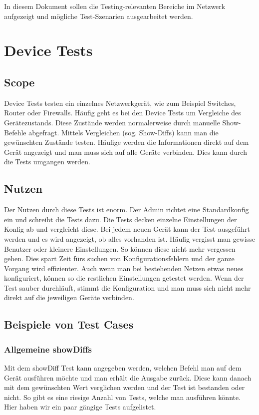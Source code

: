 \documentclass[a4,12pt]{scrartcl}
\begin{document}
\noindent In diesem Dokument sollen die Testing-relevanten Bereiche im Netzwerk aufgezeigt und mögliche Test-Szenarien ausgearbeitet werden.
\newpage
\section{Device Tests}
\subsection{Scope}
Device Tests testen ein einzelnes Netzwerkgerät, wie zum Beispiel Switches, Router oder Firewalls. Häufig geht es bei den Device Tests um Vergleiche des Gerätezustands. Diese Zustände werden normalerweise durch manuelle Show-Befehle abgefragt. Mittels Vergleichen (sog. Show-Diffs) kann man die gewünschten Zustände testen. \newline\newline
Häufige werden die Informationen direkt auf dem Gerät angezeigt und man muss sich auf alle Geräte verbinden. Dies kann durch die Tests umgangen werden. 
\subsection{Nutzen}
Der Nutzen durch diese Tests ist enorm. Der Admin richtet eine Standardkonfig ein und schreibt die Tests dazu. Die Tests decken einzelne Einstellungen der Konfig ab und vergleicht diese. Bei jedem neuen Gerät kann der Test ausgeführt werden und es wird angezeigt, ob alles vorhanden ist. Häufig vergisst man gewisse Benutzer oder kleinere Einstellungen. So können diese nicht mehr vergessen gehen.\newline\newline
Dies spart Zeit fürs suchen von Konfigurationsfehlern und der ganze Vorgang wird effizienter. Auch wenn man bei bestehenden Netzen etwas neues konfiguriert, können so die restlichen Einstellungen getestet werden. Wenn der Test sauber durchläuft, stimmt die Konfiguration und man muss sich nicht mehr direkt auf die jeweiligen Geräte verbinden. 
\subsection{Beispiele von Test Cases}
\subsubsection{Allgemeine showDiffs}
Mit dem showDiff Test kann angegeben werden, welchen Befehl man auf dem Gerät ausführen möchte und man erhält die Ausgabe zurück. Diese kann danach mit dem gewünschten Wert verglichen werden und der Test ist bestanden oder nicht.
So gibt es eine riesige Anzahl von Tests, welche man ausführen könnte. Hier haben wir ein paar gängige Tests aufgelistet.
\end{document}
